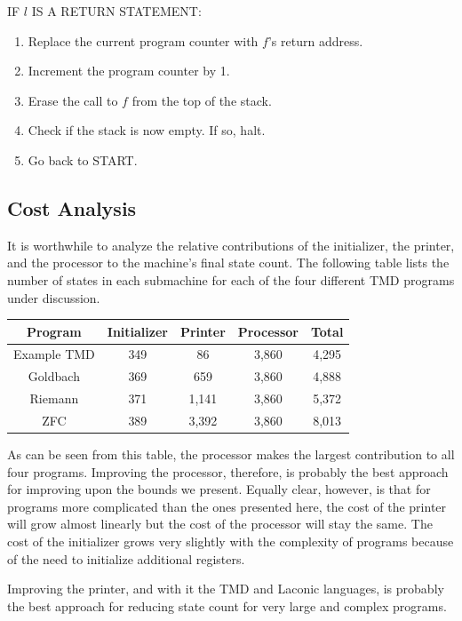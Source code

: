 \documentclass[11pt]{article}
\newcommand{\statenum}{8,013 }
\newcommand{\gbstatenum}{4,888 }
\newcommand{\rmstatenum}{5,372 }
\begin{document}
IF $l$ IS A RETURN STATEMENT:
\begin{enumerate}
\item Replace the current program counter with $f$'s return address.
\item Increment the program counter by 1.
\item Erase the call to $f$ from the top of the stack.
\item Check if the stack is now empty. If so, halt.
\item Go back to START.
\end{enumerate}

\subsection{Cost Analysis} \label{sec:cost}

It is worthwhile to analyze the relative contributions of the initializer, the printer, and the processor to the machine's final state count. The following table lists the number of states in each submachine for each of the four different TMD programs under discussion. 

\begin{center}
    \begin{tabular}{||c c c c c||}
    \hline
    Program & Initializer & Printer & Processor & Total \\ [0.5ex]
    \hline\hline
    Example TMD & 349 & 86 & 3,860 & 4,295 \\
    \hline
    Goldbach & 369 & 659 & 3,860 & \gbstatenum \\
    \hline
    Riemann & 371 & 1,141 & 3,860 & \rmstatenum \\
    \hline 
    ZFC & 389 & 3,392 & 3,860 & \statenum \\
    \hline
    \end{tabular}
\end{center}

As can be seen from this table, the processor makes the largest contribution to all four programs. Improving the processor, therefore, is probably the best approach for improving upon the bounds we present. Equally clear, however, is that for programs more complicated than the ones presented here, the cost of the printer will grow almost linearly but the cost of the processor will stay the same. The cost of the initializer grows very slightly with the complexity of programs because of the need to initialize additional registers. 

Improving the printer, and with it the TMD and Laconic languages, is probably the best approach for reducing state count for very large and complex programs.
\end{document}
